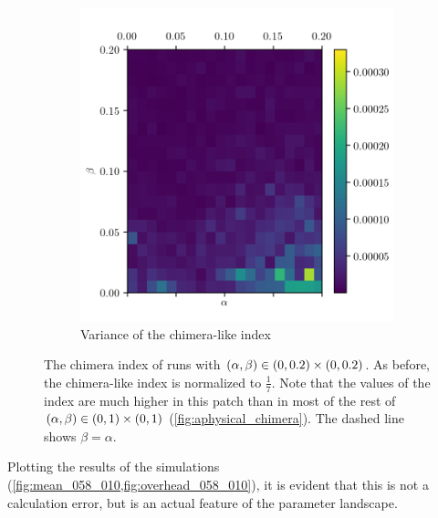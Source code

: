 \begin{figure}[ht]
\begin{subfigure}{0.45\textwidth}
    \includegraphics[width=\textwidth]{figure/zoom_chimera_var}
    \caption{Variance of the chimera-like index}
    \label{fig:zoom_chimera_var}
  \end{subfigure}
  \caption[Zoomed landscape]{The chimera index of runs with $(\alpha, \beta) \in (0, 0.2) \times (0, 0.2)$.
    As before, the chimera-like index is normalized to $\frac{1}{7}$.
    Note that the values of the index are much higher in this patch than in most of the rest of $(\alpha, \beta) \in (0, 1) \times (0, 1)$ (\cref{fig:aphysical_chimera}).
    The dashed line shows $\beta = \alpha$.
  }
\end{figure}
Plotting the results of the simulations (\cref{fig:mean_058_010,fig:overhead_058_010}),
it is evident that this is not a calculation error, but is an actual feature of the parameter landscape.
